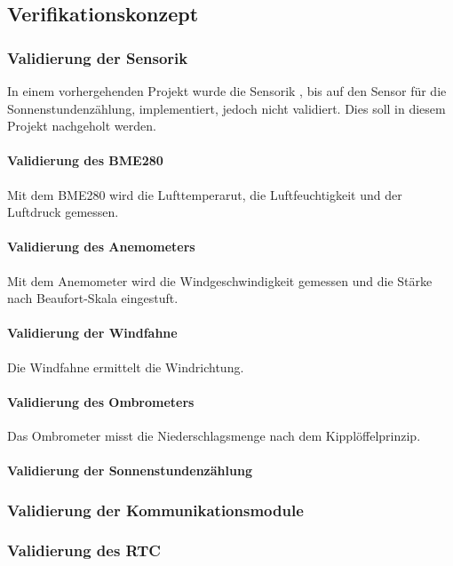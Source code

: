 \subsection{Verifikationskonzept}
\subsubsection{Validierung der Sensorik}
In einem vorhergehenden Projekt wurde die Sensorik , bis auf den Sensor für die Sonnenstundenzählung, implementiert, jedoch nicht validiert. Dies soll in diesem Projekt nachgeholt werden.\\
\paragraph{Validierung des BME280}
Mit dem BME280 wird die Lufttemperarut, die Luftfeuchtigkeit und der Luftdruck gemessen.
\paragraph{Validierung des Anemometers}
Mit dem Anemometer wird die Windgeschwindigkeit gemessen und die Stärke nach Beaufort-Skala eingestuft.
\paragraph{Validierung der Windfahne}
Die Windfahne ermittelt die Windrichtung.
\paragraph{Validierung des Ombrometers}
Das Ombrometer misst die Niederschlagsmenge nach dem Kipplöffelprinzip.
\paragraph{Validierung der Sonnenstundenzählung}
\subsubsection{Validierung der Kommunikationsmodule}
\subsubsection{Validierung des RTC}
